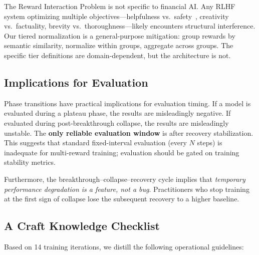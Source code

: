 \documentclass[sigconf]{acmart}
\begin{document}
The Reward Interaction Problem is not specific to financial AI. Any RLHF system optimizing multiple objectives---helpfulness vs.\ safety~\cite{bai2022constitutional}, creativity vs.\ factuality, brevity vs.\ thoroughness---likely encounters structural interference. Our tiered normalization is a general-purpose mitigation: group rewards by semantic similarity, normalize within groups, aggregate across groups. The specific tier definitions are domain-dependent, but the architecture is not.

\subsection{Implications for Evaluation}

Phase transitions have practical implications for evaluation timing. If a model is evaluated during a plateau phase, the results are misleadingly negative. If evaluated during post-breakthrough collapse, the results are misleadingly unstable. The \textbf{only reliable evaluation window} is after recovery stabilization. This suggests that standard fixed-interval evaluation (every $N$ steps) is inadequate for multi-reward training; evaluation should be gated on training stability metrics.

Furthermore, the breakthrough--collapse--recovery cycle implies that \textit{temporary performance degradation is a feature, not a bug}. Practitioners who stop training at the first sign of collapse lose the subsequent recovery to a higher baseline.

\subsection{A Craft Knowledge Checklist}

Based on 14 training iterations, we distill the following operational guidelines:
\end{document}
